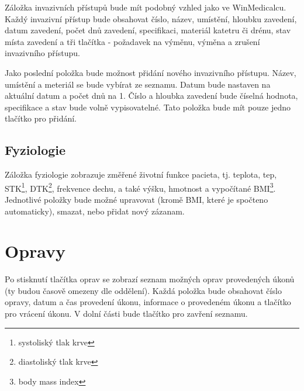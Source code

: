 Záložka invazivních přístupů bude mít podobný vzhled jako ve WinMedicalcu. Každý invazivní přístup bude obsahovat číslo, název, umístění, hloubku zavedení, datum zavedení, počet dnů zavedení, specifikaci, materiál katetru či drénu, stav místa zavedení a tři tlačítka - požadavek na výměnu, výměna a zrušení invazivního přístupu.

Jako poslední položka bude možnost přidání nového invazivního přístupu. Název, umístění a meteriál se bude vybírat ze seznamu. Datum bude nastaven na aktuální datum a počet dnů na 1. Číslo a hloubka zavedení bude číselná hodnota, specifikace a stav bude volně vypisovatelné. Tato položka bude mít pouze jedno tlačítko pro přidání.

\subsection{Fyziologie}

Záložka fyziologie zobrazuje změřené životní funkce pacieta, tj. teplota, tep, STK\footnote{systoliský tlak krve}, DTK\footnote{diastoliský tlak krve}, frekvence dechu, a také výšku, hmotnost a vypočítané BMI\footnote{body mass index}. Jednotlivé položky bude možné upravovat (kromě BMI, které je spočteno automaticky), smazat, nebo přidat nový zázanam.

\section{Opravy}

Po stisknutí tlačítka oprav se zobrazí seznam možných oprav provedených úkonů (ty budou časově omezeny dle oddělení). Každá položka bude obsahovat číslo opravy, datum a čas provedení úkonu, informace o provedeném úkonu a tlačítko pro vrácení úkonu. V dolní části bude tlačítko pro zavření seznamu.
